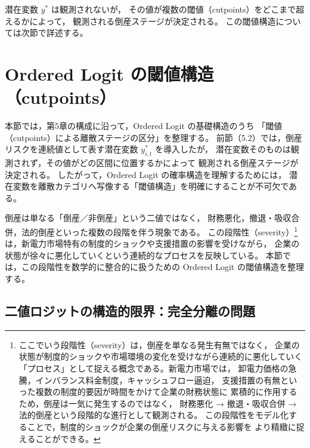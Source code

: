 潜在変数 $y^*$ は観測されないが，
その値が複数の閾値（cutpoints）をどこまで超えるかによって，
観測される倒産ステージが決定される。
この閾値構造については次節で詳述する。



\section{Ordered Logit の閾値構造（cutpoints）}
\label{sec:ordered_cutpoints}

本節では，第5章の構成に沿って，Ordered Logit の基礎構造のうち
「閾値（cutpoints）による離散ステージの区分」を整理する。
前節（5.2）では，倒産リスクを連続値として表す潜在変数 $y^*_{i,t}$ を導入したが，
潜在変数そのものは観測されず，その値がどの区間に位置するかによって
観測される倒産ステージが決定される。
したがって，Ordered Logit の確率構造を理解するためには，
潜在変数を離散カテゴリへ写像する「閾値構造」を明確にすることが不可欠である。

倒産は単なる「倒産／非倒産」という二値ではなく，
財務悪化，撤退・吸収合併，法的倒産といった複数の段階を伴う現象である。
この段階性（severity）\footnote{
ここでいう段階性（severity）は，倒産を単なる発生有無ではなく，
企業の状態が制度的ショックや市場環境の変化を受けながら連続的に悪化していく
「プロセス」として捉える概念である。新電力市場では，
卸電力価格の急騰，インバランス料金制度，キャッシュフロー逼迫，
支援措置の有無といった複数の制度的要因が時間をかけて企業の財務状態に
累積的に作用するため，倒産は一気に発生するのではなく，
財務悪化 → 撤退・吸収合併 → 法的倒産という段階的な進行として観測される。
この段階性をモデル化することで，制度的ショックが企業の倒産リスクに与える影響を
より精緻に捉えることができる。
}
は，新電力市場特有の制度的ショックや支援措置の影響を受けながら，
企業の状態が徐々に悪化していくという連続的なプロセスを反映している。
本節では，この段階性を数学的に整合的に扱うための Ordered Logit の閾値構造を整理する。


\subsection{二値ロジットの構造的限界：完全分離の問題}

